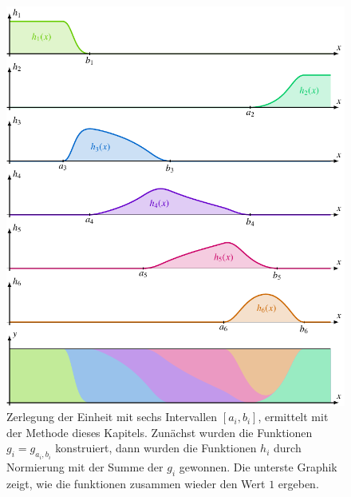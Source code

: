 %
%
%
\begin{figure}
\centering
\includegraphics{chapters/030-kurvenintegral/images/zerlegung.pdf}
\caption{Zerlegung der Einheit mit sechs Intervallen $[a_i,b_i]$,
ermittelt mit der Methode dieses Kapitels.
Zunächst wurden die Funktionen $g_i = g_{a_i,b_i}$ konstruiert, dann
wurden die Funktionen $h_i$ durch Normierung mit der Summe der $g_i$
gewonnen.
Die unterste Graphik zeigt, wie die funktionen zusammen wieder den
Wert $1$ ergeben.
\label{buch:kurvenintegral:fig:zerlegung}}
\end{figure}
